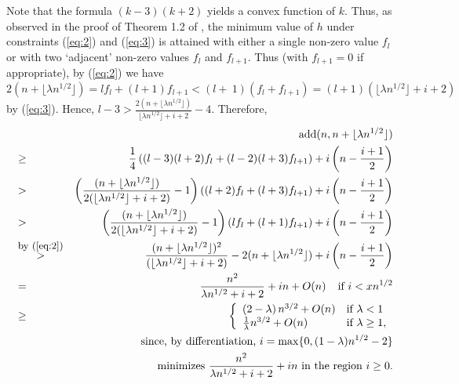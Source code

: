\documentclass{article}
\newtheorem{Proof of Theorem}{Proof of Theorem}
\begin{document}
Note that the formula $(k-3)(k+2)$ yields a convex function of $k$.
Thus, as observed in the proof of Theorem 1.2 of \cite{ger2},
the minimum value of $h$ under constraints (\ref{eq:2}) and (\ref{eq:3})
is attained with either a single non-zero value $f_{l}$
or with two `adjacent' non-zero values $f_{l}$ and $f_{l+1}$.
Thus (with $f_{l+1}=0$ if appropriate), 
by (\ref{eq:2}) we have 
$2(n+\lfloor \lambda n^{1/2} \rfloor)=lf_{l}+(l+1)f_{l+1} < (l+~1)(f_{l}+f_{l+1}) = 
(l+1)(\lfloor \lambda n^{1/2} \rfloor+i+2)$ by (\ref{eq:3}).
Hence, $l-3 > \frac{2(n+\lfloor \lambda n^{1/2} \rfloor)}{\lfloor \lambda n^{1/2} \rfloor+i+2}-4$.
Therefore, 
\begin{eqnarray}
& & \textrm{add}(n,n+\lfloor \lambda n^{1/2} \rfloor) \nonumber \\
& \geq & \frac{1}{4} \left( (l-3)(l+2)f_{l} + (l-2)(l+3)f_{l+1} \right) + i \left( n - \frac{i+1}{2} \right) \nonumber \\ 
& > & \left(\frac{(n+\lfloor \lambda n^{1/2} \rfloor)}{2(\lfloor \lambda n^{1/2} \rfloor+i+2)}-1\right) 
\left( (l+2)f_{l} + (l+3)f_{l+1} \right) + i \left( n - \frac{i+1}{2} \right) \nonumber \\
& > & \left(\frac{(n+\lfloor \lambda n^{1/2} \rfloor)}{2(\lfloor \lambda n^{1/2} \rfloor+i+2)}-1\right) 
\left( lf_{l} + (l+1)f_{l+1} \right) + i \left( n - \frac{i+1}{2} \right) \nonumber \\
& \stackrel{\textrm{\small{by (\ref{eq:2})}}}> & 
\frac{(n+\lfloor \lambda n^{1/2} \rfloor)^{2}}{(\lfloor \lambda n^{1/2} \rfloor+i+2)}
-2(n+\lfloor \lambda n^{1/2} \rfloor)  + i \left( n - \frac{i+1}{2} \right) \label{eq:pre2} \\
& = & \frac{n^{2}}{\lambda n^{1/2} + i + 2} + in + O(n) \phantom{w} \textrm{ if } i < xn^{1/2} \nonumber \\
& \geq & \left\{ \begin{array}{ll}
\left( 2 - \lambda \right) n^{3/2} + O(n) & \textrm{if } \lambda < 1 \\
\frac{1}{\lambda} n^{3/2} + O(n) & \textrm{if } \lambda \geq 1, \\
\end{array} \right. \nonumber \\
& & \textrm{since, by differentiation, } i = \max \{ 0, (1- \lambda)n^{1/2} -2 \}
\nonumber \\
& & \textrm{minimizes } 
\frac{n^{2}}{\lambda n^{1/2} + i + 2} + in
\textrm{ in the region } i \geq 0. \nonumber \\ \nonumber 
\end{eqnarray} 
\end{document}
